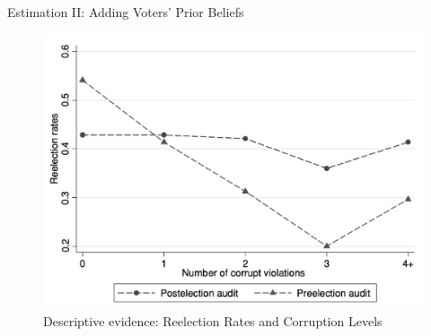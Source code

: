 \begin{frame}{Estimation II: Adding Voters' Prior Beliefs}
    \begin{figure}\label{fig3}
        \centering
        \includegraphics[height = 0.65 \textheight]{images/fig3.png}
        \caption{Descriptive evidence: Reelection Rates and Corruption Levels}
        \end{figure}
\end{frame}

